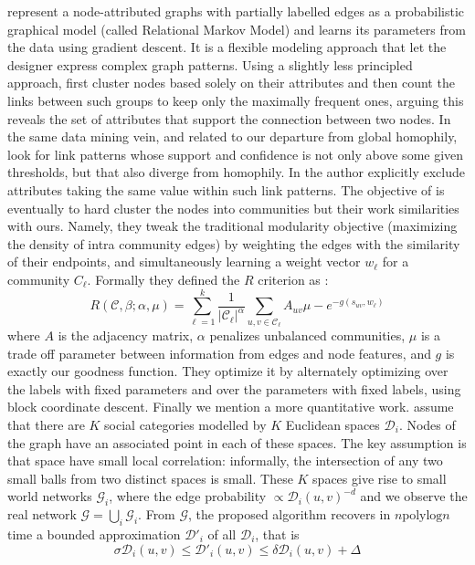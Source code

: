 \Textcite{Taskar04} represent a node-attributed graphs with partially labelled edges as a
probabilistic graphical model (called Relational Markov Model) and learns its parameters from the
data using gradient descent. It is a flexible modeling approach that let the designer express
complex graph patterns. Using a slightly less principled approach, \textcite{conceptualLinks12}
first cluster nodes based solely on their attributes and then count the links between such groups to
keep only the maximally frequent ones, arguing this reveals the set of attributes that support the
connection between two nodes. In the same data mining vein, and related to our departure from global
homophily, \textcite{beyondHome16} look for link patterns whose support and confidence is not only
above some given thresholds, but that also diverge from homophily. In the author explicitly exclude
attributes taking the same value within such link patterns.
The objective of \textcite{ZhangModelFree16} is eventually to hard cluster the nodes into
communities but their work similarities with ours. Namely, they tweak the traditional modularity
objective (maximizing the density of intra community edges) by weighting the edges with the
similarity of their endpoints, and simultaneously learning a weight vector $w_\ell$ for a community
$C_\ell$. Formally they defined the $R$ criterion as :
\begin{equation*}
  R(\mathcal{C}, \beta;\alpha, \mu) = \sum_{\ell=1}^k \frac{1}{|\mathcal{C}_\ell|^\alpha}
  \sum_{u,v \in \mathcal{C}_\ell} A_{uv} \mu -e^{-g(s_{uv}, w_\ell)}
\end{equation*}
where $A$ is the adjacency matrix, $\alpha$ penalizes unbalanced communities, $\mu$ is a trade off
parameter between information from edges and node features, and $g$ is exactly our goodness
function.  They optimize it by alternately optimizing over the labels with fixed parameters and over
the parameters with fixed labels, using block coordinate descent.
Finally we mention a more quantitative work. \Textcite{Abraham2012a} assume that there are $K$
social categories modelled by $K$ Euclidean spaces $\mathcal{D}_i$. Nodes of the graph have an
associated point in each of these spaces. The key assumption is that space have small local
correlation: informally, the intersection of any two small balls from two distinct spaces is small.
These $K$ spaces give rise to small world networks $\mathcal{G}_i$, where the edge probability
$\propto \mathcal{D}_i(u, v)^{-d}$ and we observe the real network $\mathcal{G} =\bigcup_i
\mathcal{G}_i$. From $\mathcal{G}$, the proposed algorithm recovers in $n \mathrm{polylog} n$ time a
bounded approximation $\mathcal{D}'_i$ of all $\mathcal{D}_i$, that is
\begin{equation*}
  \sigma \mathcal{D}_i(u, v) \leq \mathcal{D}'_i(u, v) \leq \delta \mathcal{D}_i(u, v) + \Delta
\end{equation*}

